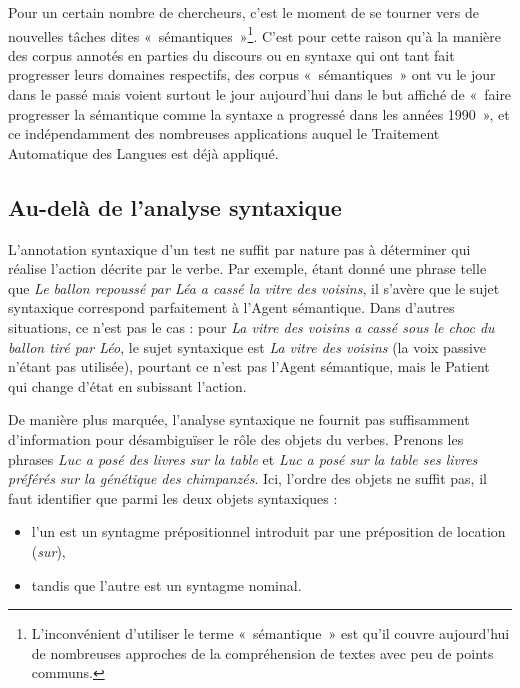 Pour un certain nombre de chercheurs, c'est le moment de se tourner vers de
nouvelles tâches dites «~sémantiques~»\footnote{L'inconvénient d'utiliser le
terme «~sémantique~» est qu'il couvre aujourd'hui de nombreuses approches de la
compréhension de textes avec peu de points communs.}. C'est pour cette raison
qu'à la manière des corpus annotés en parties du discours ou en syntaxe qui ont
tant fait progresser leurs domaines respectifs, des corpus «~sémantiques~» ont
vu le jour dans le passé \citep{framenet,propbank,penn discourse
treebank,rstbank,timebank} mais voient surtout le jour aujourd'hui
\citep{candito2014developing,bos2012annotating,banarescu2013abstract} dans le
but affiché de «~faire progresser la sémantique comme la syntaxe a progressé
dans les années 1990~», et ce indépendamment des nombreuses applications auquel
le Traitement Automatique des Langues est déjà appliqué.

\subsection{Au-delà de l'analyse syntaxique}

L'annotation syntaxique d'un test ne suffit par nature pas à déterminer qui
réalise l'action décrite par le verbe. Par exemple, étant donné une phrase
telle que \emph{Le ballon repoussé par Léa a cassé la vitre des voisins}, il
s'avère que le sujet syntaxique correspond parfaitement à l'Agent sémantique.
Dans d'autres situations, ce n'est pas le cas : pour \emph{La vitre des voisins
a cassé sous le choc du ballon tiré par Léo}, le sujet syntaxique est \emph{La
vitre des voisins} (la voix passive n'étant pas utilisée), pourtant ce n'est
pas l'Agent sémantique, mais le Patient qui change d'état en subissant
l'action.

De manière plus marquée, l'analyse syntaxique ne fournit pas suffisamment
d'information pour désambiguïser le rôle des objets du verbes. Prenons les
phrases \emph{Luc a posé des livres sur la table} et \emph{Luc a posé sur la
table ses livres préférés sur la génétique des chimpanzés}. Ici, l'ordre des
objets ne suffit pas, il faut identifier que parmi les deux objets syntaxiques
:
\begin{itemize}
    \item l'un est un syntagme prépositionnel introduit par une
        préposition de location (\emph{sur}),
    \item tandis que l'autre est un syntagme nominal.
\end{itemize}

